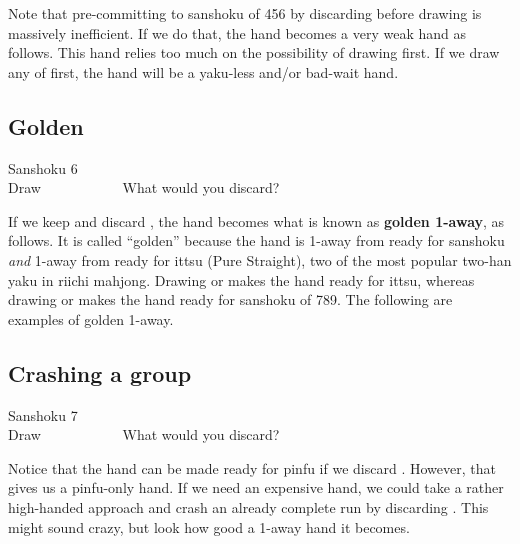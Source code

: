\bigskip
Note that pre-committing to {\jap sanshoku} of 456 by discarding {\LARGE{}} before drawing {\LARGE{}} is massively inefficient. If we do that, the hand becomes a very weak hand as follows. 
\bp
{}
\ep
This hand relies too much on the possibility of drawing {\LARGE{}} first. If we draw any of {\LARGE{}} first, the hand will be a {\jap yaku}-less and/or bad-wait hand.

\newpage
\subsection{Golden}\label{sec:san6}
\begin{itembox}[r]{{\jap Sanshoku} 6}
\bp
{}~\\
\hfill\footnotesize{Draw~~~~~~~~~~~}
\ep
\vspace{-17pt}What would you discard? \vspace{-5pt}
\end{itembox}
\noindent
If we keep {\LARGE{}} and discard {\LARGE{}}, the hand becomes what is known as {\bf golden 1-away}, as follows.
\bp
{}
\ep {}
It is called ``golden'' because the hand is 1-away from ready for {\jap sanshoku} \emph{and} 1-away from ready for {\jap ittsu} (Pure Straight), two of the most popular two-{\jap han yaku} in riichi mahjong. 
Drawing {\LARGE{}} or {\LARGE{}} makes the hand ready for {\jap ittsu}, whereas drawing {\LARGE{}} or {\LARGE{}} makes the hand ready for {\jap sanshoku} of 789. The following are examples of golden 1-away.
\bp
{}\fa\fa\\
\ep

\newpage
\subsection{Crashing a group}\label{sec:san7}
\begin{itembox}[r]{{\jap Sanshoku} 7}
\bp
{}~\\
\hfill\footnotesize{Draw~~~~~~~~~~~}
\ep
\vspace{-15pt}What would you discard? \vspace{-5pt}
\end{itembox}
\noindent
Notice that the hand can be made ready for {\jap pinfu} if we discard {\LARGE{}}. However, that gives us a {\jap pinfu}-only hand. If we need an expensive hand, we could take a rather high-handed approach and crash an already complete run by discarding {\LARGE{}}. This might sound crazy, but look how good a 1-away hand it becomes.

